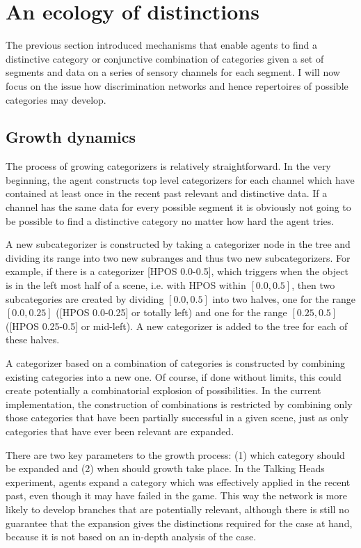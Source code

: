 \section{An ecology of distinctions}

The previous section introduced mechanisms that 
enable agents to find a distinctive category or
conjunctive combination of categories given 
a set of segments and data on a series of sensory 
channels for each segment. I will now focus on the 
issue how discrimination networks and hence
repertoires of possible categories may develop. 

\subsection{Growth dynamics}

The process of growing categorizers is relatively
straightforward. In the very beginning, the agent
constructs top level categorizers for each channel which 
have contained at least once 
in the recent past relevant and distinctive
data. If a channel has the same data for every 
possible segment it is obviously not going to be 
possible to find a distinctive category no matter
how hard the agent tries. 

A new subcategorizer is constructed by taking a
categorizer node in the tree and dividing its range into 
two new subranges and thus two new subcategorizers.
For example, if there is a 
categorizer [HPOS 0.0-0.5], which triggers when the 
object is in the left most half of a scene, i.e. with HPOS
within $[0.0,0.5]$, then two 
subcategories are created by dividing $[0.0,0.5]$
into two halves, one for the 
range $[0.0,0.25]$ ([HPOS 0.0-0.25] or totally left) 
and one for the range $[0.25,0.5]$ ([HPOS 0.25-0.5] or mid-left). 
A new categorizer is added to the tree for each of these
halves. 

A categorizer based on a combination of categories is 
constructed by combining existing categories into a new one. 
Of course, if done without limits, this could create potentially 
a combinatorial explosion of possibilities. In the 
current implementation, the construction of combinations
is restricted by combining only those categories that 
have been partially successful in a given scene, 
just as only categories that
have ever been relevant are expanded. 

There are two key parameters to the growth process: 
(1) which category should be expanded and (2) when should
growth take place. In the Talking Heads experiment, agents expand 
a category which was effectively applied in the 
recent past, even though it may have failed in the game. 
This way the network is more likely to 
develop branches that are potentially relevant, although 
there is still no guarantee that the expansion
gives the distinctions required for the case at hand, 
because it is not based on an in-depth analysis of 
the case. 


